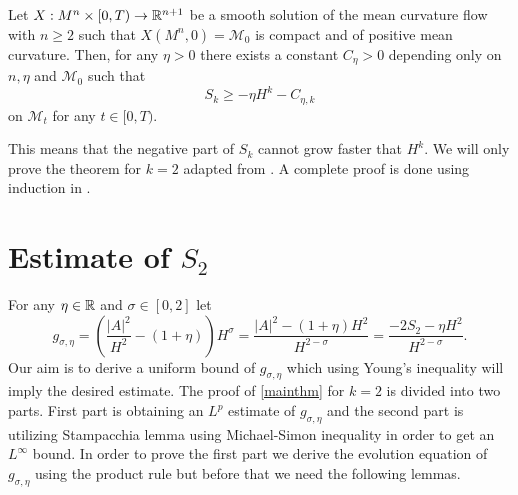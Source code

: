 \begin{thm}\label{mainthm}
    Let $ X : M^{n} \times [0,T) \to \mathbb{R}^{n+1}$ be a smooth solution of the mean curvature flow with $ n \ge 2 $ such that $ X(M^{n}, 0) = \mathcal{M}_{0} $ is compact and of positive mean curvature. Then, for any $ \eta >0 $ there exists a constant $ C_{\eta} >0 $ depending only on $ n, \eta $ and $ \mathcal{M}_{0} $ such that 
    \begin{equation}
        S_{k} \ge - \eta H^{k} - C_{\eta,k}
    \end{equation}
    on $ \mathcal{M}_{t} $ for any $ t \in [0,T) $.
\end{thm}

This means that the negative part of $ S_{k} $ cannot grow faster that $ H^{k} $. We will only prove the theorem for $ k=2 $ adapted from \cite{huisken1999mean}. A complete proof is done using induction in \cite{huisken1999convexity}. 
\section{Estimate of $S_{2}$}
For any $ \eta \in \mathbb{R} $ and $ \sigma \in [0,2] $ let $$ g_{\sigma,\eta} = \left( \frac{|A|^{2}}{H^{2}}- (1+ \eta) \right)H^{\sigma} = \frac{|A|^{2}-(1+\eta)H^{2}}{H^{2-\sigma}} = \frac{-2S_{2}- \eta H^{2}}{H^{2-\sigma}}.$$
Our aim is to derive a uniform bound of $ g_{\sigma,\eta} $ which using Young's inequality will imply the desired estimate. The proof of \cref{mainthm} for $ k=2 $ is divided into two parts. First part is obtaining an $ L^{p} $ estimate of $ g_{ \sigma, \eta} $ and the second part is utilizing Stampacchia lemma using Michael-Simon inequality in order to get an $ L^{\infty} $ bound. In order to prove the first part we derive the evolution equation of $ g_{\sigma,\eta} $ using the product rule but before that we need the following lemmas. 

